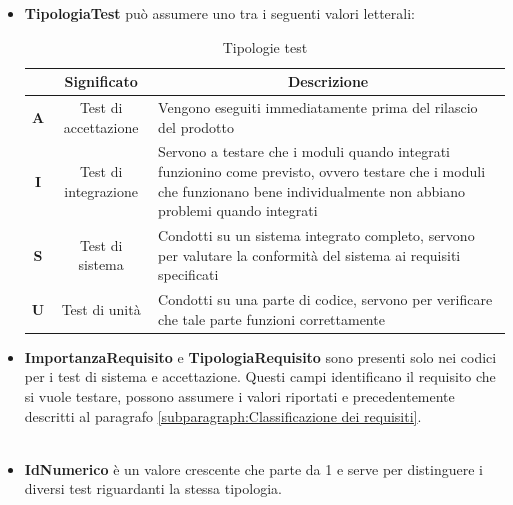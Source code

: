             \begin{itemize}[label={}]
                \item \textbf{TipologiaTest} può assumere uno tra i seguenti valori letterali:
                \begin{table}[H]
                    \centering
                    \renewcommand{\arraystretch}{1.8}
                    \begin{tabular}{c|c|p{12cm}}
                        \rowcolor[HTML]{125E28} 
                        \multicolumn{1}{c}{\color[HTML]{FFFFFF}\textbf{Sigla}}
                        & \multicolumn{1}{c}{\color[HTML]{FFFFFF}\textbf{Significato}}
                        & \multicolumn{1}{c}{\color[HTML]{FFFFFF}\textbf{Descrizione}}\\
                        \hline
                        \textbf{A} & Test di accettazione & Vengono eseguiti immediatamente prima del rilascio del prodotto\\
                        \textbf{I} & Test di integrazione & Servono a testare che i moduli quando integrati funzionino come previsto, ovvero testare che i moduli che funzionano bene individualmente non abbiano problemi quando integrati\\
                        \textbf{S} & Test di sistema      & Condotti su un sistema integrato completo, servono per valutare la conformità del sistema ai requisiti specificati\\
                        \textbf{U} & Test di unità        & Condotti su una parte di codice, servono per verificare che tale parte funzioni correttamente\\
                    \end{tabular}
                    \caption{Tipologie test}
                \end{table}
                \item \textbf{ImportanzaRequisito} e \textbf{TipologiaRequisito} sono presenti solo nei codici per i test di sistema e accettazione. Questi campi identificano il requisito che si vuole testare, possono assumere i valori riportati e precedentemente descritti al paragrafo \ref{subparagraph:Classificazione dei requisiti}.\\\\
                \item \textbf{IdNumerico} è un valore crescente che parte da 1 e serve per distinguere i diversi test riguardanti la stessa tipologia.
            \end{itemize}
    

